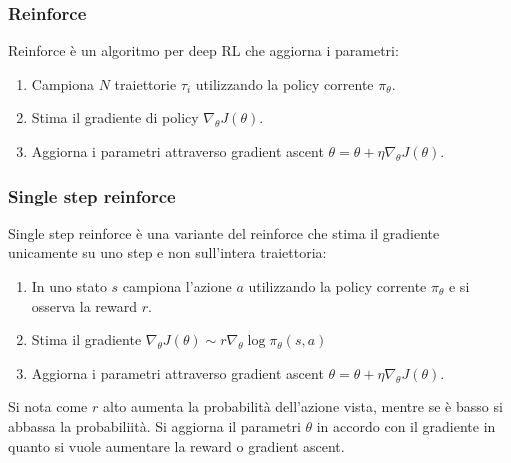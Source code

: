 		\subsubsection{Reinforce}
		Reinforce \`e un algoritmo per deep RL che aggiorna i parametri:
		\begin{enumerate}
			\item Campiona $N$ traiettorie $\tau_i$ utilizzando la policy corrente $\pi_\theta$.
			\item Stima il gradiente di policy $\nabla_\theta J(\theta)$.
			\item Aggiorna i parametri attraverso gradient ascent $\theta = \theta + \eta\nabla_\theta J(\theta)$.
		\end{enumerate}

		\subsubsection{Single step reinforce}
		Single step reinforce \`e una variante del reinforce che stima il gradiente unicamente su uno step e non sull'intera traiettoria:
		\begin{enumerate}
			\item In uno stato $s$ campiona l'azione $a$ utilizzando la policy corrente $\pi_\theta$ e si osserva la reward $r$.
			\item Stima il gradiente $\nabla_\theta J(\theta)\sim r\nabla_\theta\log\pi_\theta(s,a)$
			\item Aggiorna i parametri attraverso gradient ascent $\theta = \theta + \eta\nabla_\theta J(\theta)$.
		\end{enumerate}
		Si nota come $r$ alto aumenta la probabilit\`a dell'azione vista, mentre se \`e basso si abbassa la probabiliit\`a.
		Si aggiorna il parametri $\theta$ in accordo con il gradiente in quanto si vuole aumentare la reward o gradient ascent.
